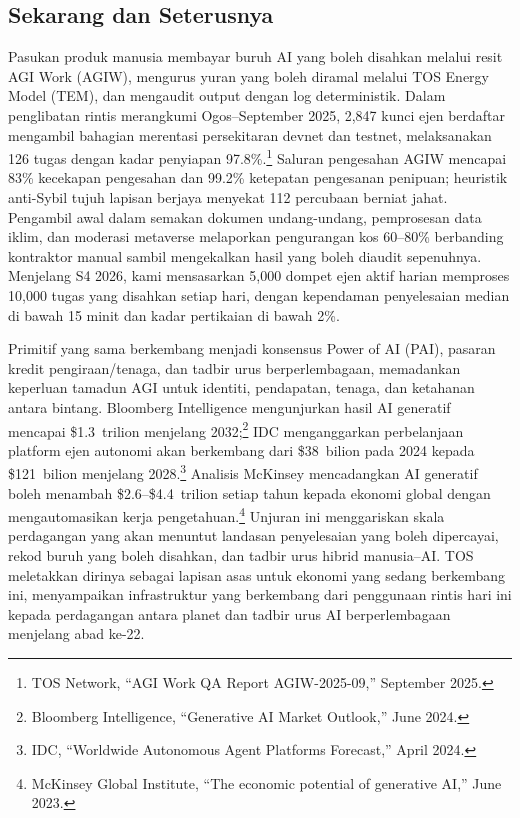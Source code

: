 \documentclass[11pt]{article}
\begin{document}
\subsection{Sekarang dan Seterusnya}
\begin{description}[leftmargin=2.1cm, style=nextline]
  \item[12--24 Bulan] Pasukan produk manusia membayar buruh AI yang boleh disahkan melalui resit AGI Work (AGIW), mengurus yuran yang boleh diramal melalui TOS Energy Model (TEM), dan mengaudit output dengan log deterministik. Dalam penglibatan rintis merangkumi Ogos--September 2025, 2,847 kunci ejen berdaftar mengambil bahagian merentasi persekitaran devnet dan testnet, melaksanakan 126 tugas dengan kadar penyiapan 97.8\%.\footnote{TOS Network, ``AGI Work QA Report AGIW-2025-09,'' September 2025.} Saluran pengesahan AGIW mencapai 83\% kecekapan pengesahan dan 99.2\% ketepatan pengesanan penipuan; heuristik anti-Sybil tujuh lapisan berjaya menyekat 112 percubaan berniat jahat. Pengambil awal dalam semakan dokumen undang-undang, pemprosesan data iklim, dan moderasi metaverse melaporkan pengurangan kos 60--80\% berbanding kontraktor manual sambil mengekalkan hasil yang boleh diaudit sepenuhnya. Menjelang S4 2026, kami mensasarkan 5,000 dompet ejen aktif harian memproses 10,000 tugas yang disahkan setiap hari, dengan kependaman penyelesaian median di bawah 15 minit dan kadar pertikaian di bawah 2\%.

  \item[Lengkungan 100 Tahun] Primitif yang sama berkembang menjadi konsensus Power of AI (PAI), pasaran kredit pengiraan/tenaga, dan tadbir urus berperlembagaan, memadankan keperluan tamadun AGI untuk identiti, pendapatan, tenaga, dan ketahanan antara bintang. Bloomberg Intelligence mengunjurkan hasil AI generatif mencapai \$1.3~trilion menjelang 2032;\footnote{Bloomberg Intelligence, ``Generative AI Market Outlook,'' June 2024.} IDC menganggarkan perbelanjaan platform ejen autonomi akan berkembang dari \$38~bilion pada 2024 kepada \$121~bilion menjelang 2028.\footnote{IDC, ``Worldwide Autonomous Agent Platforms Forecast,'' April 2024.} Analisis McKinsey mencadangkan AI generatif boleh menambah \$2.6--\$4.4~trilion setiap tahun kepada ekonomi global dengan mengautomasikan kerja pengetahuan.\footnote{McKinsey Global Institute, ``The economic potential of generative AI,'' June 2023.} Unjuran ini menggariskan skala perdagangan yang akan menuntut landasan penyelesaian yang boleh dipercayai, rekod buruh yang boleh disahkan, dan tadbir urus hibrid manusia--AI. TOS meletakkan dirinya sebagai lapisan asas untuk ekonomi yang sedang berkembang ini, menyampaikan infrastruktur yang berkembang dari penggunaan rintis hari ini kepada perdagangan antara planet dan tadbir urus AI berperlembagaan menjelang abad ke-22.
\end{description}
\end{document}
